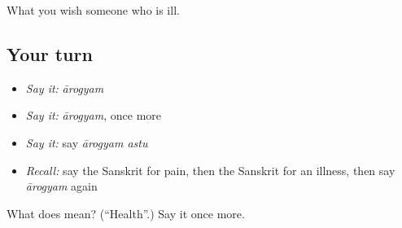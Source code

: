 \begin{grammarlens}[title={What you've built}]
What you wish someone who is ill.
\end{grammarlens}

\subsection*{Your turn}
\begin{itemize}
\raggedright
  \item \emph{Say it:} \emph{ārogyam}
  \item \emph{Say it:} \emph{ārogyam}, once more
  \item \emph{Say it:} say \emph{ārogyam astu}
  \item \emph{Recall:} say the Sanskrit for pain, then the Sanskrit for an illness, then say \emph{ārogyam} again
\end{itemize}

\begin{tcolorbox}[breakable,colback=teal!4,colframe=teal!35!black,title={Before you move on}]
What does  mean? (\textquotedblleft{}Health\textquotedblright{}.) Say it once more.
\end{tcolorbox}
